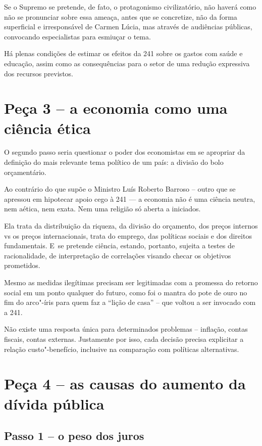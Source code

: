 Se o Supremo se pretende, de fato, o protagonismo civilizatório, não
haverá como não se pronunciar sobre essa ameaça, antes que se
concretize, não da forma superficial e irresponsável de Carmen Lúcia,
mas através de audiências públicas, convocando especialistas para
esmiuçar o tema.

Há plenas condições de estimar os efeitos da  241 sobre os gastos com
saúde e educação, assim como as consequências para o setor de uma
redução expressiva dos recursos previstos.

\section{Peça 3 -- a economia como uma ciência ética}

O segundo passo seria questionar o poder dos economistas em se apropriar
da definição do mais relevante tema político de um país: a divisão do
bolo orçamentário.

Ao contrário do que supõe o Ministro Luís Roberto Barroso -- outro que
se apressou em hipotecar apoio cego à 241 --- a economia não é uma
ciência neutra, nem aética, nem exata. Nem uma religião só aberta a
iniciados.

Ela trata da distribuição da riqueza, da divisão do orçamento, dos
preços internos vs os preços internacionais, trata do emprego, das
políticas sociais e dos direitos fundamentais. E~se pretende ciência,
estando, portanto, sujeita a testes de racionalidade, de interpretação
de correlações visando checar os objetivos prometidos.

Mesmo as medidas ilegítimas precisam ser legitimadas com a promessa do
retorno social em um ponto qualquer do futuro, como foi o mantra do pote
de ouro no fim do arco"-íris para quem faz a ``lição de casa'' -- que
voltou a ser invocado com a  241.

Não existe uma resposta única para determinados problemas -- inflação,
contas fiscais, contas externas. Justamente por isso, cada decisão
precisa explicitar a relação custo"-benefício, inclusive na comparação
com políticas alternativas.

\section{Peça 4 -- as causas do aumento da dívida pública}

\subsection{Passo 1 -- o peso dos juros}


